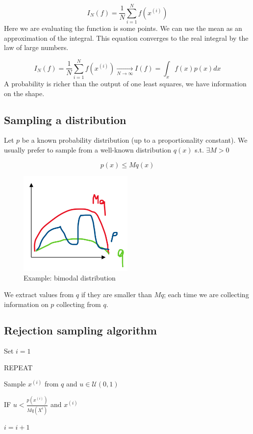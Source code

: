 $$
I_N(f)=\frac{1}{N} \sum^N_{i=1} f(x^{(i)})
$$
\noindent
Here we are evaluating the function is some points. We can use the mean
as an approximation of the integral. This equation converges to the real
integral by the law of large numbers.

$$
I_N(f)=\frac{1}{N} \sum^N_{i=1} f(x^{(i)})  \xrightarrow[N \rightarrow \infty  ]{}   I(f)= \int_x f(x)p(x)dx
$$
\noindent
A probability is richer than the output of one least squares, we have
information on the shape.


\subsection{Sampling a distribution}

Let $p$ be a known probability distribution (up to a proportionality
constant). We usually prefer to sample from a well-known distribution
$q(x)$ s.t. $\exists M>0$

$$
p(x) \leq M q(x)
$$


\begin{figure}
\centering
\includegraphics[width=0.5\textwidth]{distribution.png}
\caption{Example: bimodal distribution}
\end{figure}
\noindent
We extract values from $q$ if they are smaller than $Mq$; each time we
are collecting information on $p$ collecting from $q$.

\subsection{Rejection sampling algorithm}

Set $i=1$

REPEAT

Sample $x^{(i)}$ from $q$ and $u \in \mathcal{U}(0,1)$

IF $u < \frac{p(x^{(i)})}{Mq(X^i)}$ and $x^{(i)}$

$i=i+1$

